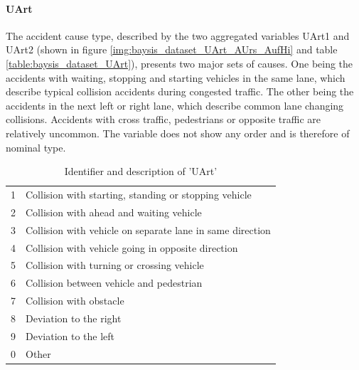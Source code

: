 \paragraph{UArt}
The accident cause type, described by the two aggregated variables UArt1 and UArt2 (shown in figure \autoref{img:baysis_dataset_UArt_AUrs_AufHi} and table \autoref{table:baysis_dataset_UArt}), presents two major sets of causes. One being the accidents with waiting, stopping and starting vehicles in the same lane, which describe typical collision accidents during congested traffic. The other being the accidents in the next left or right lane, which describe common lane changing collisions. Accidents with cross traffic, pedestrians or opposite traffic are relatively uncommon. The variable does not show any order and is therefore of nominal type.
\noindent
\begin{table}[ht]
	\centering
	\begin{tabular}{c|l}  
 		1 & Collision with starting, standing or stopping vehicle  \\ 
 		2 & Collision with ahead and waiting vehicle  \\
 		3 & Collision with vehicle on separate lane in same direction  \\
 		4 & Collision with vehicle going in opposite direction  \\
 		5 & Collision with turning or crossing vehicle  \\
 		6 & Collision between vehicle and pedestrian  \\
 		7 & Collision with obstacle  \\
 		8 & Deviation to the right  \\
 		9 & Deviation to the left  \\
 		0 & Other  \\
	\end{tabular}
	\caption{Identifier and description of 'UArt'}
	\label{table:baysis_dataset_UArt}
\end{table}


